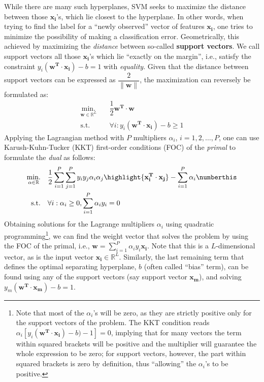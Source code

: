 \begin{enumerate}[(1)]
While there are many such hyperplanes, SVM seeks to maximize the distance between those $\mathbf{x_i}$'s, which lie closest to the hyperplane. In other words, when trying to find the label for a \enquote{newly observed} vector of features $\mathbf{x_i}$, one tries to minimize the possibility of making a classification error. Geometrically, this achieved by maximizing the \textit{distance} between so-called \textbf{support vectors}. We call support vectors all those $\mathbf{x_i}$'s which lie \enquote{exactly on the margin}, i.e., satisfy the constraint $y_i (\mathbf{w^T} \cdot \mathbf{x_i}) - b = 1$ with \textit{equality}. Given that the distance between support vectors can be expressed as $\dfrac{2}{\lVert \mathbf{w} \rVert}$, the maximization can reversely be formulated as:
\begin{align*}
\underset{\mathbf{w} \in \mathbb{R}^L}{\text{min.}} \quad & \dfrac{1}{2} \mathbf{w^T} \cdot \mathbf{w} \\
\text{s.t.} \quad & \forall i: y_i (\mathbf{w^T} \cdot \mathbf{x_i}) - b \geq 1
\end{align*}
Applying the Lagrangian method with $P$ multipliers $\alpha_i$, $i=1, 2, \dots, P$, one can use Karush-Kuhn-Tucker (KKT) first-order conditions (FOC) of the \textit{primal} to formulate the \textit{dual} as follows:
\begin{align*}
\underset{\mathbf{\alpha} \in \mathbb{R}}{\text{min.}} \quad &  \dfrac{1}{2} \sum_{i=1}^{P} \sum_{j=1}^{P} y_i y_j \alpha_i \alpha_j \highlight{\mathbf{x_i^T} \cdot \mathbf{x_j}}  - \sum_{i=1}^{P} \alpha_i \numberthis \label{eq: SVM} \\
\text{s.t.} \quad & \forall i: \alpha_i \geq 0 , \sum_{i=1}^{P} \alpha_i y_i = 0
\end{align*}
Obtaining solutions for the Lagrange multipliers $\alpha_i$ using quadratic programming\footnote{Note that most of the $\alpha_i$'s will be zero, as they are strictly positive only for the support vectors of the problem. The KKT condition reads $\alpha_i [ y_i (\mathbf{w^T} \cdot \mathbf{x_i}) - b) - 1 ] = 0 $, implying that for many vectors the term within squared brackets will be positive and the multiplier will guarantee the whole expression to be zero; for support vectors, however, the part within squared brackets is zero by definition, thus \enquote{allowing} the $\alpha_i$'s to be positive.}, we can find the weight vector that solves the problem by using the FOC of the primal, i.e., $ \mathbf{w} = \sum_{i=1}^{P} \alpha_i y_i \mathbf{x_i}$. Note that this is a $L$-dimensional vector, as is the input vector $\mathbf{x_i} \in \mathbb{R}^L$. Similarly, the last remaining term that defines the optimal separating hyperplane, $b$ (often called \enquote{bias} term), can be found using any of the support vectors (say support vector $\mathbf{x_m}$), and solving $y_m (\mathbf{w^T} \cdot \mathbf{x_m}) - b = 1$. 


\end{enumerate}

